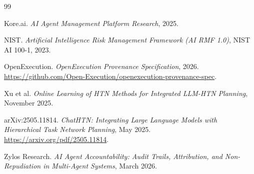 \begin{thebibliography}{99}
\item Kore.ai. \emph{AI Agent Management Platform Research}, 2025.

\item NIST. \emph{Artificial Intelligence Risk Management Framework (AI RMF 1.0)}, NIST AI 100-1, 2023.

\item OpenExecution. \emph{OpenExecution Provenance Specification}, 2026. \url{https://github.com/Open-Execution/openexecution-provenance-spec}.

\item Xu et al. \emph{Online Learning of HTN Methods for Integrated LLM-HTN Planning}, November 2025.

\item arXiv:2505.11814. \emph{ChatHTN: Integrating Large Language Models with Hierarchical Task Network Planning}, May 2025. \url{https://arxiv.org/pdf/2505.11814}.

\item Zylos Research. \emph{AI Agent Accountability: Audit Trails, Attribution, and Non-Repudiation in Multi-Agent Systems}, March 2026.

\end{thebibliography}